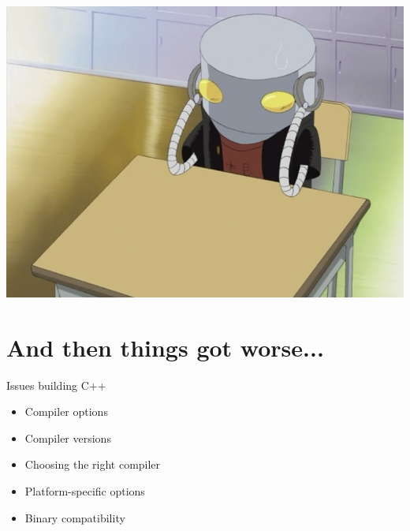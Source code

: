 \documentclass[pdf]{beamer}
\begin{document}
\begin{frame}
    \begin{center}
        \includegraphics[height = 0.8\textheight]{img/mechazawa-sad.jpg}
    \end{center}
\end{frame}

\section{And then things got worse...}

\begin{frame}{Issues building C++}
    \begin{itemize}[<+->]
        \item Compiler options
        \item Compiler versions
        \item Choosing the right compiler
        \item Platform-specific options
        \item Binary compatibility
    \end{itemize}
\end{frame}
\end{document}
